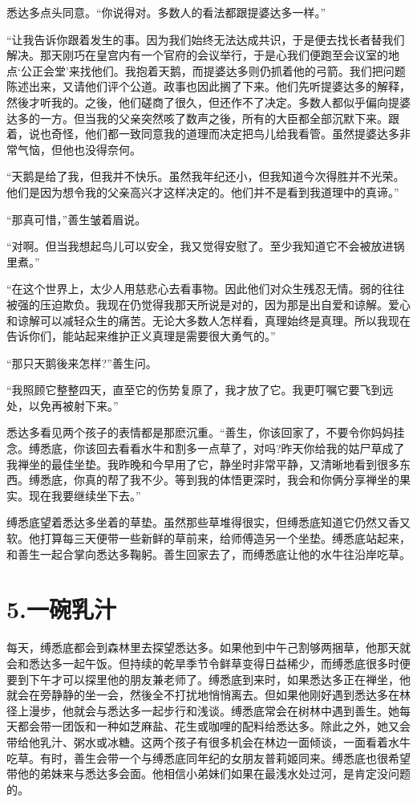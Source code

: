 \documentclass[12pt,twoside,openany]{book}
\begin{document}
悉达多点头同意。“你说得对。多数人的看法都跟提婆达多一样。”

“让我告诉你跟着发生的事。因为我们始终无法达成共识，于是便去找长者替我们解决。那天刚巧在皇宫内有一个官府的会议举行，于是心我们便跑至会议室的地点‘公正会堂’来找他们。我抱着天鹅，而提婆达多则仍抓着他的弓箭。我们把问题陈述出来，又请他们评个公道。政事也因此搁了下来。他们先听提婆达多的解释，然後才听我的。之後，他们磋商了很久，但还作不了决定。多数人都似乎偏向提婆达多的一方。但当我的父亲突然咳了数声之後，所有的大臣都全部沉默下来。跟着，说也奇怪，他们都一致同意我的道理而决定把鸟儿给我看管。虽然提婆达多非常气恼，但他也没得奈何。

“天鹅是给了我，但我并不快乐。虽然我年纪还小，但我知道今次得胜并不光荣。他们是因为想令我的父亲高兴才这样决定的。他们并不是看到我道理中的真谛。”

“那真可惜，”善生皱着眉说。

“对啊。但当我想起鸟儿可以安全，我又觉得安慰了。至少我知道它不会被放进锅里煮。”

“在这个世界上，太少人用慈悲心去看事物。因此他们对众生残忍无情。弱的往往被强的压迫欺负。我现在仍觉得我那天所说是对的，因为那是出自爱和谅解。爱心和谅解可以减轻众生的痛苦。无论大多数人怎样看，真理始终是真理。所以我现在告诉你们，能站起来维护正义真理是需要很大勇气的。”

“那只天鹅後来怎样?”善生问。

“我照顾它整整四天，直至它的伤势复原了，我才放了它。我更叮嘱它要飞到远处，以免再被射下来。”

悉达多看见两个孩子的表情都是那麽沉重。“善生，你该回家了，不要令你妈妈挂念。缚悉底，你该回去看看水牛和割多一点草了，对吗?昨天你给我的姑尸草成了我禅坐的最佳坐垫。我昨晚和今早用了它，静坐时非常平静，又清晰地看到很多东西。缚悉底，你真的帮了我不少。等到我的体悟更深时，我会和你俩分享禅坐的果实。现在我要继续坐下去。”

缚悉底望着悉达多坐着的草垫。虽然那些草堆得很实，但缚悉底知道它仍然又香又软。他打算每三天便带一些新鲜的草前来，给师傅造另一个坐垫。缚悉底站起来，和善生一起合掌向悉达多鞠躬。善生回家去了，而缚悉底让他的水牛往沿岸吃草。

\chapter{5.一碗乳汁}\label{ch5}

每天，缚悉底都会到森林里去探望悉达多。如果他到中午己割够两捆草，他那天就会和悉达多一起午饭。但持续的乾旱季节令鲜草变得日益稀少，而缚悉底很多时便要到下午才可以探里他的朋友兼老师了。缚悉底到来时，如果悉达多正在禅坐，他就会在旁静静的坐一会，然後全不打扰地悄悄离去。但如果他刚好遇到悉达多在林径上漫步，他就会与悉达多一起步行和浅谈。缚悉底常会在树林中遇到善生。她每天都会带一团饭和一种如芝麻盐、花生或咖哩的配料给悉达多。除此之外，她又会带给他乳汁、粥水或冰糖。这两个孩子有很多机会在林边一面倾谈，一面看着水牛吃草。有时，善生会带一个与缚悉底同年纪的女朋友普莉姬同来。缚悉底也很希望带他的弟妹来与悉达多会面。他相信小弟妹们如果在最浅水处过河，是肯定没问题的。
\end{document}
